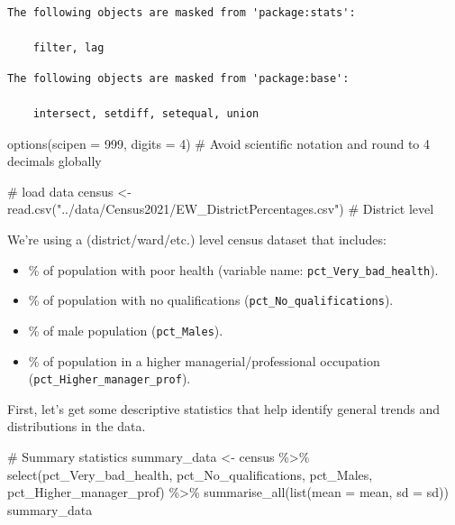 \documentclass[
  letterpaper,
  DIV=11,
  numbers=noendperiod]{scrreprt}
\newenvironment{Shaded}{\begin{snugshade}}{\end{snugshade}}
\newcommand{\AttributeTok}[1]{\textcolor[rgb]{0.40,0.45,0.13}{#1}}
\newcommand{\CommentTok}[1]{\textcolor[rgb]{0.37,0.37,0.37}{#1}}
\newcommand{\DecValTok}[1]{\textcolor[rgb]{0.68,0.00,0.00}{#1}}
\newcommand{\FunctionTok}[1]{\textcolor[rgb]{0.28,0.35,0.67}{#1}}
\newcommand{\NormalTok}[1]{\textcolor[rgb]{0.00,0.23,0.31}{#1}}
\newcommand{\OtherTok}[1]{\textcolor[rgb]{0.00,0.23,0.31}{#1}}
\newcommand{\SpecialCharTok}[1]{\textcolor[rgb]{0.37,0.37,0.37}{#1}}
\newcommand{\StringTok}[1]{\textcolor[rgb]{0.13,0.47,0.30}{#1}}
\providecommand{\tightlist}{%
  \setlength{\itemsep}{0pt}\setlength{\parskip}{0pt}}
\begin{document}
\begin{verbatim}
The following objects are masked from 'package:stats':

    filter, lag
\end{verbatim}

\begin{verbatim}
The following objects are masked from 'package:base':

    intersect, setdiff, setequal, union
\end{verbatim}

\begin{Shaded}
\begin{Highlighting}[]
\FunctionTok{options}\NormalTok{(}\AttributeTok{scipen =} \DecValTok{999}\NormalTok{, }\AttributeTok{digits =} \DecValTok{4}\NormalTok{)  }\CommentTok{\# Avoid scientific notation and round to 4 decimals globally}

\CommentTok{\# load data}
\NormalTok{census }\OtherTok{\textless{}{-}} \FunctionTok{read.csv}\NormalTok{(}\StringTok{"../data/Census2021/EW\_DistrictPercentages.csv"}\NormalTok{) }\CommentTok{\# District level}
\end{Highlighting}
\end{Shaded}

We're using a (district/ward/etc.) level census dataset that includes:

\begin{itemize}
\tightlist
\item
  \% of population with poor health (variable name:
  \texttt{pct\_Very\_bad\_health}).
\item
  \% of population with no qualifications
  (\texttt{pct\_No\_qualifications}).
\item
  \% of male population (\texttt{pct\_Males}).
\item
  \% of population in a higher managerial/professional occupation
  (\texttt{pct\_Higher\_manager\_prof}).
\end{itemize}

First, let's get some descriptive statistics that help identify general
trends and distributions in the data.

\begin{Shaded}
\begin{Highlighting}[]
\CommentTok{\# Summary statistics}
\NormalTok{summary\_data }\OtherTok{\textless{}{-}}\NormalTok{ census }\SpecialCharTok{\%\textgreater{}\%}
  \FunctionTok{select}\NormalTok{(pct\_Very\_bad\_health, pct\_No\_qualifications, pct\_Males, pct\_Higher\_manager\_prof) }\SpecialCharTok{\%\textgreater{}\%}
  \FunctionTok{summarise\_all}\NormalTok{(}\FunctionTok{list}\NormalTok{(}\AttributeTok{mean =}\NormalTok{ mean, }\AttributeTok{sd =}\NormalTok{ sd))}
\NormalTok{summary\_data}
\end{Highlighting}
\end{Shaded}
\end{document}
